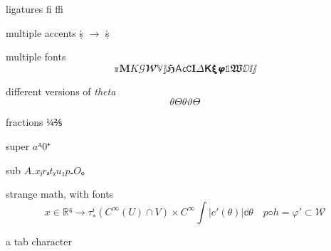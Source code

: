 \documentclass[a4paper,english]{article}
\begin{document}
ligatures ﬁ ﬃ

multiple accents ṩ \(→\)  \.{\d{s}}

multiple fonts
\[ ℼ 𝐌 𝐾 𝒢 𝓦 𝕍 𝕛 𝕳 𝖠 𝘤 𝙲 𝚰 𝛥 𝝟 𝝽 𝞿 𝟙 𝖂 ⅅ ⅈ ⅉ\]



different versions of \emph{theta}
\[\theta Θ  θ  ϑ  ϴ \]

fractions
\(¼ ⅖ \)

super \(aᴬ 0⁺\)



sub \(A₋ xⱼ rₐ tᵪ u₁ p₌ Oᵩ\)


strange math, with fonts
\[𝑥 ∈ ℝ⁶→  τ_∗^ i (C ^ ∞ (U ) ∩ V) × 𝐶^ ∞  ∫ |𝑐' (𝜃)| 𝕕𝜃 \quad 𝑝◦ℎ = 𝜑' ⊂ 𝒲\]

a	tab character
\end{document}
